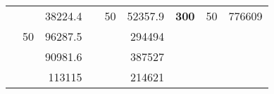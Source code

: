 \begin{table}[H]
\begin{tabular}{|ccrccrccc}
\rowcolor[HTML]{DDFDFF} 
\multicolumn{1}{|c|}{\cellcolor[HTML]{FFFFC7}}                                & \multicolumn{1}{c|}{\cellcolor[HTML]{DDFDFF}}                      & \multicolumn{1}{r|}{\cellcolor[HTML]{DAE8FC}38224.4}   & \multicolumn{1}{c|}{\cellcolor[HTML]{FFFFC7}}                                & \multicolumn{1}{c|}{\multirow{-10}{*}{\cellcolor[HTML]{DDFDFF}50}}  & \multicolumn{1}{r|}{\cellcolor[HTML]{DDFDFF}52357.9}   & \multicolumn{1}{c|}{\multirow{-19}{*}{\cellcolor[HTML]{FFFFC7}\textbf{300}}} & \multicolumn{1}{c|}{\multirow{-10}{*}{\cellcolor[HTML]{DDFDFF}50}} & \multicolumn{1}{r|}{\cellcolor[HTML]{DDFDFF}776609}    \\ \cline{3-3} \cline{5-9} 
\multicolumn{1}{|c|}{\cellcolor[HTML]{FFFFC7}}                                & \multicolumn{1}{c|}{\multirow{-10}{*}{\cellcolor[HTML]{DDFDFF}50}} & \multicolumn{1}{r|}{\cellcolor[HTML]{DDFDFF}96287.5}   & \multicolumn{1}{c|}{\cellcolor[HTML]{FFFFC7}}                                & \multicolumn{1}{c|}{\cellcolor[HTML]{DAE8FC}}                       & \multicolumn{1}{r|}{\cellcolor[HTML]{DAE8FC}294494}    &                                                                              &                                                                    &                                                        \\ \cline{2-3} \cline{6-6}
\multicolumn{1}{|c|}{\cellcolor[HTML]{FFFFC7}}                                & \multicolumn{1}{c|}{\cellcolor[HTML]{DAE8FC}}                      & \multicolumn{1}{r|}{\cellcolor[HTML]{DAE8FC}90981.6}   & \multicolumn{1}{c|}{\cellcolor[HTML]{FFFFC7}}                                & \multicolumn{1}{c|}{\cellcolor[HTML]{DAE8FC}}                       & \multicolumn{1}{r|}{\cellcolor[HTML]{DDFDFF}387527}    &                                                                              &                                                                    &                                                        \\ \cline{3-3} \cline{6-6}
\multicolumn{1}{|c|}{\cellcolor[HTML]{FFFFC7}}                                & \multicolumn{1}{c|}{\cellcolor[HTML]{DAE8FC}}                      & \multicolumn{1}{r|}{\cellcolor[HTML]{DDFDFF}113115}    & \multicolumn{1}{c|}{\cellcolor[HTML]{FFFFC7}}                                & \multicolumn{1}{c|}{\cellcolor[HTML]{DAE8FC}}                       & \multicolumn{1}{r|}{\cellcolor[HTML]{DAE8FC}214621}    &                                                                              &                                                                    &                                                        \\ \cline{3-3} \cline{6-6}

\end{tabular}
\end{table}
